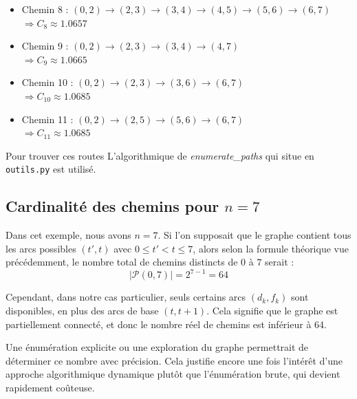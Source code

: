 \documentclass[a4paper,11pt]{article}
\begin{document}
\begin{itemize}
    \item Chemin 8 : $(0,2) \to (2,3) \to (3,4) \to (4,5) \to (5,6) \to (6,7)$ \\
    \hspace{0.5cm} $\Rightarrow C_8 \approx 1.0657$
    \vspace{0.3cm}

    \item Chemin 9 : $(0,2) \to (2,3) \to (3,4) \to (4,7)$ \\
    \hspace{0.5cm} $\Rightarrow C_9 \approx 1.0665$
    \vspace{0.3cm}

    \item Chemin 10 : $(0,2) \to (2,3) \to (3,6) \to (6,7)$ \\
    \hspace{0.5cm} $\Rightarrow C_{10} \approx 1.0685$
    \vspace{0.3cm}

    \item Chemin 11 : $(0,2) \to (2,5) \to (5,6) \to (6,7)$ \\
    \hspace{0.5cm} $\Rightarrow C_{11} \approx 1.0685$
    \vspace{0.3cm}
\end{itemize}

Pour trouver ces routes L'algorithmique de \textit{enumerate\_paths} qui situe en \texttt{outils.py} est utilisé.


    \subsection{Cardinalité des chemins pour $n = 7$}
    Dans cet exemple, nous avons $n = 7$. Si l'on supposait que le graphe contient tous les arcs possibles $(t', t)$ avec $0 \leq t' < t \leq 7$, alors selon la formule théorique vue précédemment, le nombre total de chemins distincts de $0$ à $7$ serait :
    \[
    |\mathcal{P}(0, 7)| = 2^{7 - 1} = 64
    \]

    Cependant, dans notre cas particulier, seuls certains arcs $(d_k, f_k)$ sont disponibles, en plus des arcs de base $(t, t+1)$. Cela signifie que le graphe est partiellement connecté, et donc le nombre réel de chemins est inférieur à 64.

    Une énumération explicite ou une exploration du graphe permettrait de déterminer ce nombre avec précision. Cela justifie encore une fois l’intérêt d’une approche algorithmique dynamique plutôt que l’énumération brute, qui devient rapidement coûteuse.
\end{document}
